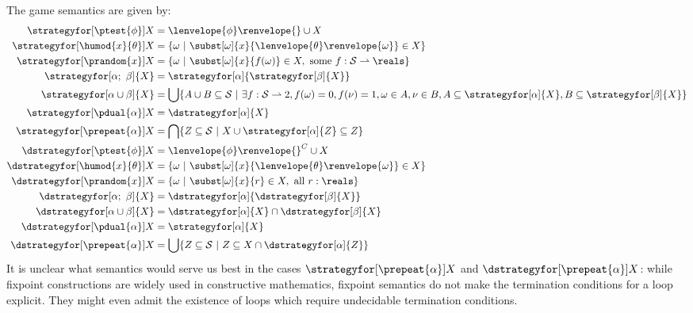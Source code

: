\documentclass[12pt]{cmuthesis}
\theoremstyle{definition}
\theoremstyle{remark}
\newcommand{\allstate}{\mathcal{S}}
\newcommand{\om}{\omega}
\newcommand{\tint}[2]{\lenvelope{#1}\renvelope{#2}}
\newcommand{\fint}[1]{\lenvelope{#1}\renvelope}
\begin{document}


The game semantics are given by:
\begin{align*}
  \strategyfor[\ptest{\phi}]{X}      &= \fint{\phi}{} \cup X\\
  \strategyfor[\humod{x}{\theta}]{X} &= \{\om~|~\subst[\om]{x}{\tint{\theta}{\om}} \in X\}\\
  \strategyfor[\prandom{x}]{X}       &= \{\om~|~\subst[\om]{x}{f(\om)} \in X, \text{ some }f:\allstate\mto\reals\}\\
  \strategyfor[\alpha;~\beta]{X}     &= \strategyfor[\alpha]{\strategyfor[\beta]{X}}\\
  \strategyfor[\alpha\cup\beta]{X}   &= \bigcup\{A \cup B \subseteq \allstate~|~\exists f:\allstate\mto 2, f(\om)=0,f(\nu)=1,\om\in A, \nu \in B, A \subseteq\strategyfor[\alpha]{X}, B \subseteq\strategyfor[\beta]{X}\}\\
  \strategyfor[\pdual{\alpha}]{X}    &= \dstrategyfor[\alpha]{X}\\
  \strategyfor[\prepeat{\alpha}]{X}  &= \bigcap\{Z\subseteq\allstate~|~X\cup\strategyfor[\alpha]{Z} \subseteq Z\}\\
  \dstrategyfor[\ptest{\phi}]{X}      &= \fint{\phi}{}^C \cup X\\
  \dstrategyfor[\humod{x}{\theta}]{X} &= \{\om~|~\subst[\om]{x}{\tint{\theta}{\om}} \in X\}\\
  \dstrategyfor[\prandom{x}]{X}       &= \{\om~|~\subst[\om]{x}{r} \in X, \text{ all }r:\reals\}\\
  \dstrategyfor[\alpha;~\beta]{X}     &= \dstrategyfor[\alpha]{\dstrategyfor[\beta]{X}}\\
  \dstrategyfor[\alpha\cup\beta]{X}   &= \dstrategyfor[\alpha]{X} \cap \dstrategyfor[\beta]{X}\\
  \dstrategyfor[\pdual{\alpha}]{X}    &= \strategyfor[\alpha]{X}\\
  \dstrategyfor[\prepeat{\alpha}]{X}  &= \bigcup\{Z\subseteq\allstate~|~Z\subseteq X\cap \dstrategyfor[\alpha]{Z}\}
\end{align*}
It is unclear what semantics would serve us best in the cases $\strategyfor[\prepeat{\alpha}]{X}$ and $\dstrategyfor[\prepeat{\alpha}]{X}$: while fixpoint constructions are widely used in constructive mathematics, fixpoint semantics do not make the termination conditions for a loop explicit.
They might even admit the existence of loops which require undecidable termination conditions.
\end{document}
